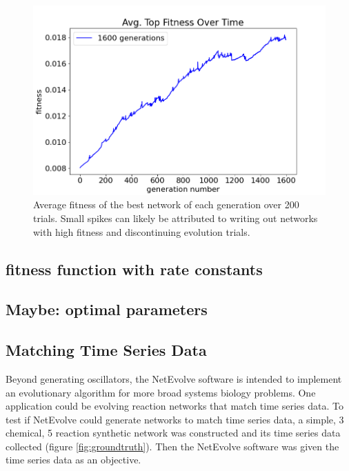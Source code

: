 \documentclass[12pt]{report}
\begin{document}
\begin{figure}
\centering
    \includegraphics[width=15cm]{images/1600_top_fitness.png}
    \caption[Average top fitness over 1600 generations]{Average fitness of the best network of each generation over 200 trials. Small spikes can likely be attributed to writing out networks with high fitness and discontinuing evolution trials.}
    \label{fig:1600_top_fitness}
\end{figure}

\subsection{fitness function with rate constants}


\subsection{Maybe: optimal parameters}

\subsection{Matching Time Series Data}
Beyond generating oscillators, the NetEvolve software is intended to implement an evolutionary algorithm for more broad systems biology problems. One application could be evolving reaction networks that match time series data. To test if NetEvolve could generate networks to match time series data, a simple, 3 chemical, 5 reaction synthetic network was constructed and its time series data collected (figure \ref{fig:groundtruth}). Then the NetEvolve software was given the time series data as an objective. 
\end{document}
